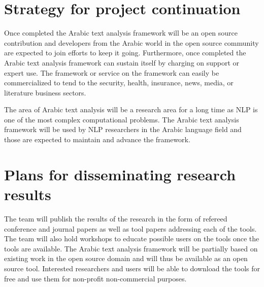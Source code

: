 \documentclass[12pt]{article}
\begin{document}
\section{Strategy for project continuation}
\label{s:continue}


Once completed the Arabic text analysis framework will be an open source contribution and developers from the Arabic world in the open source community are expected to join efforts to keep it going.
 Furthermore, once completed the Arabic text analysis framework can sustain itself by charging on support or expert use.
 The framework or service on the framework can easily be commercialized to tend to the security, health, insurance, news, media, or literature business sectors.
 
The area of Arabic text analysis will be a research area for a long time as NLP is one of the most complex computational problems.
 The Arabic text analysis framework will be used by NLP researchers in the Arabic language field and those are expected to maintain and advance the framework.




\section{Plans for disseminating research results}
\label{s:dissem}

The team will publish the results of the research in the form 
of refereed conference and journal papers as well as tool papers 
addressing each of the tools. 
The team will also hold workshops to educate possible users on the 
tools once the tools are available.
The Arabic text analysis framework will be partially based on 
existing work in the open source domain and will thus be available 
as an open source tool. 
Interested researchers and users will be able to download the tools 
for free and use them for non-profit non-commercial purposes.  

\pagebreak
%
%

%
{\small
  
}
\end{document}
